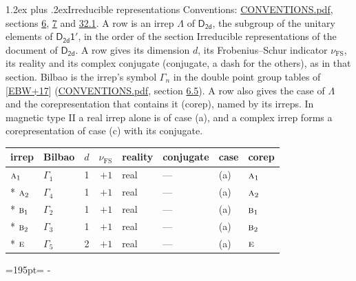 \documentclass[10pt,a4paper]{article}
\makeatletter
\renewcommand\section{\@startsection{section}{1}{\z@}{-3ex plus -1ex minus -.2ex}%
  {1.2ex plus .2ex}{\normalfont\large\sffamily\bfseries\color{parttitle}}}
\newcommand{\needspace}[1]{\par\penalty-100\begingroup\dimen0=#1\relax\dimen2=\pagegoal
  \advance\dimen2-\pagetotal\ifdim\dimen0>\dimen2\relax\ifdim\dimen2>0pt\vfil\break\fi\fi
  \endgroup}
\numberwithin{equation}{section}
\newcommand{\grp}[1]{\mathsf{#1}}
\newcommand{\irr}[1]{\text{\normalfont\scshape #1}}
\newcommand{\fsind}{\nu_{\mathrm{FS}}}
\makeatother
\begin{document}
\section{Irreducible representations}\label{s:irreps}
Conventions: \href{../../CONVENTIONS.pdf}{CONVENTIONS.pdf}, sections \href{../../../rotation/CONVENTIONS.pdf\#conv.6}{6}, \href{../../../rotation/CONVENTIONS.pdf\#conv.7}{7} and \href{../../CONVENTIONS.pdf\#conv.32.1}{32.1}.
\leavevmode\label{n:irrep.Delta}A row is an irrep $\Lambda$ of $\grp{D_{2d}}$, the subgroup of the unitary elements of $\grp{D_{2d}1'}$, in the order of the section Irreducible representations of the document of \href{../../../rotation/data/pdf/D2d.pdf}{$\grp{D_{2d}}$}. \label{n:index.dimension}\label{n:index.frobenius}\label{n:head.irrep}\label{n:head.reality}\label{n:head.conjugate}A row gives its dimension $d$, its Frobenius--Schur indicator $\fsind$, its reality and its complex conjugate (conjugate, a dash for the others), as in that section. \label{n:head.bilbao}\label{n:irrep.alias.gamma}Bilbao is the irrep's symbol $\Gamma_n$ in the double point group tables of [\href{../../../REFERENCES.pdf\#ref.EBW+17}{EBW+17}] (\href{../../CONVENTIONS.pdf}{CONVENTIONS.pdf}, section \href{../../../rotation/CONVENTIONS.pdf\#conv.6.5}{6.5}). \label{n:head.case.corep}\label{n:head.corep}A row also gives the case of $\Lambda$ and the corepresentation that contains it (corep), named by its irreps. In magnetic type II a real irrep alone is of case (a), and a complex irrep forms a corepresentation of case (c) with its conjugate.
\setlength{\emergencystretch}{2em}\par\setlength{\emergencystretch}{0pt}
{\small\renewcommand{\arraystretch}{1.25}\setlength{\tabcolsep}{4pt}\begin{longtable}{@{}llrrllll@{}}\toprule
irrep & Bilbao & $d$ & $\fsind$ & reality & conjugate & case & corep\\\midrule\endhead
\bottomrule\endfoot\endlastfoot
$\irr{a}_{1}$ & $\Gamma_{1}$ & 1 & $+1$ & real & --- & (a) & $\irr{a}_{1}$\\*
$\irr{a}_{2}$ & $\Gamma_{4}$ & 1 & $+1$ & real & --- & (a) & $\irr{a}_{2}$\\*
$\irr{b}_{1}$ & $\Gamma_{2}$ & 1 & $+1$ & real & --- & (a) & $\irr{b}_{1}$\\*
$\irr{b}_{2}$ & $\Gamma_{3}$ & 1 & $+1$ & real & --- & (a) & $\irr{b}_{2}$\\*
$\irr{e}$ & $\Gamma_{5}$ & 2 & $+1$ & real & --- & (a) & $\irr{e}$\\
\bottomrule\end{longtable}}
\needspace{195pt}
\end{document}

